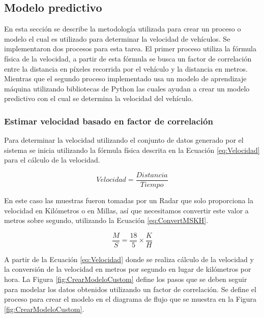 \subsection{Modelo predictivo}
\label{cap:EstimacionVelocidad}

En esta sección se describe la metodología utilizada para crear un proceso o modelo el cual es utilizado para determinar la velocidad de vehículos. Se implementaron dos procesos para esta tarea. El primer proceso utiliza la fórmula física de la velocidad, a partir de esta fórmula se busca un factor de correlación entre la distancia en píxeles recorrida por el vehículo y la distancia en metros. Mientras que el segundo proceso implementado usa un modelo de aprendizaje máquina utilizando bibliotecas de Python las cuales ayudan a crear un modelo predictivo con el cual se determina la velocidad del vehículo.

\subsubsection{Estimar velocidad basado en factor de correlación}
\label{cap:EstimarVelocidadBasadoFactorCorrelacion}
Para determinar la velocidad utilizando el conjunto de datos generado por el sistema se inicia utilizando la fórmula física descrita en la Ecuación \ref{eq:Velocidad} para el cálculo de la velocidad.

\begin{equation}
    \label{eq:Velocidad}
    Velocidad = \frac{Distancia}{Tiempo}
\end{equation}

En este caso las muestras fueron tomadas por un Radar que solo proporciona la velocidad en Kilómetros o en Millas, así que necesitamos convertir este valor a metros sobre segundo, utilizando la Ecuación \ref{eq:ConvertMSKH}.

\begin{equation}
    \label{eq:ConvertMSKH}
    \frac{M}{S} = \frac{18}{5} \times \frac{K}{H}
\end{equation}

A partir de la Ecuación \ref{eq:Velocidad} donde se realiza cálculo de la velocidad y la conversión de la velocidad en metros por segundo en lugar de kilómetros por hora. La Figura \ref{fig:CrearModeloCustom} define los pasos que se deben seguir para modelar los datos obtenidos utilizando un factor de correlación.
Se define el proceso para crear el modelo en el diagrama de flujo que se muestra en la Figura \ref{fig:CrearModeloCustom}.


